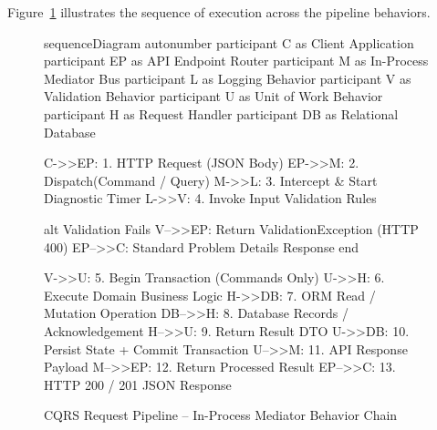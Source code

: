 Figure~\ref{fig:cqrs_pipeline} illustrates the sequence of execution across the pipeline behaviors.

\begin{figure}[H]
  \centering
  \begin{mermaid}[width=0.98\textwidth]
sequenceDiagram
    autonumber
    participant C as Client Application
    participant EP as API Endpoint Router
    participant M as In-Process Mediator Bus
    participant L as Logging Behavior
    participant V as Validation Behavior
    participant U as Unit of Work Behavior
    participant H as Request Handler
    participant DB as Relational Database

    C->>EP: 1. HTTP Request (JSON Body)
    EP->>M: 2. Dispatch(Command / Query)
    M->>L: 3. Intercept & Start Diagnostic Timer
    L->>V: 4. Invoke Input Validation Rules

    alt Validation Fails
        V-->>EP: Return ValidationException (HTTP 400)
        EP-->>C: Standard Problem Details Response
    end

    V->>U: 5. Begin Transaction (Commands Only)
    U->>H: 6. Execute Domain Business Logic
    H->>DB: 7. ORM Read / Mutation Operation
    DB-->>H: 8. Database Records / Acknowledgement
    H-->>U: 9. Return Result DTO
    U->>DB: 10. Persist State + Commit Transaction
    U-->>M: 11. API Response Payload
    M-->>EP: 12. Return Processed Result
    EP-->>C: 13. HTTP 200 / 201 JSON Response
  \end{mermaid}
  \caption{CQRS Request Pipeline -- In-Process Mediator Behavior Chain}
  \label{fig:cqrs_pipeline}
\end{figure}

